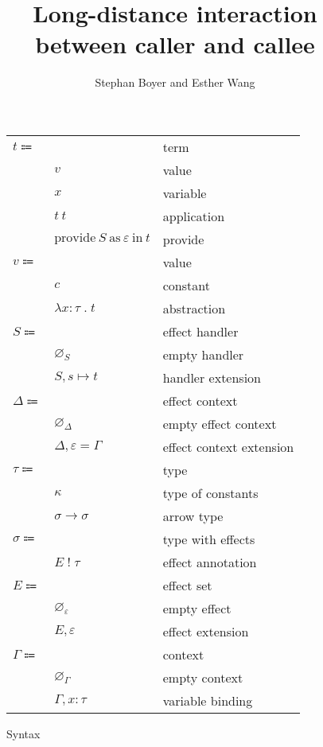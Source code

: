 \documentclass[12pt]{article}
\title{Long-distance interaction \\ between caller and callee}
\author{Stephan Boyer and Esther Wang}
\date{}
\newcommand\eterm{t}
\newcommand\evalue{v}
\newcommand\econst{c}
\newcommand\evar{x}
\newcommand\eabs[2]{\lambda#1\;.\;#2}
\newcommand\eapp[2]{#1\ #2}
\newcommand\eprovide[3]{\text{provide}\ #1\ \text{as}\ #2\ \text{in}\ #3}
\newcommand\pall{S}
\newcommand\pname{s}
\newcommand\pitem[2]{#1\mapsto#2}
\newcommand\pempty{\varnothing_{\pall}}
\newcommand\pextend[2]{#1, #2}
\newcommand\ttype{\tau}
\newcommand\tconst{\kappa}
\newcommand\tarrow[2]{#1\rightarrow#2}
\newcommand\tanno[2]{#1:#2}
\newcommand\tx{\sigma}
\newcommand\twithx[2]{#1\;!\;#2}
\newcommand\xeffect{\varepsilon}
\newcommand\xeffects{E}
\newcommand\xempty{\varnothing_{\xeffect}}
\newcommand\xextend[2]{#1, #2}
\newcommand\xc{\Delta}
\newcommand\xcempty{\varnothing_{\xc}}
\newcommand\xcextend[2]{#1, #2}
\newcommand\xcitem[2]{#1 = #2}
\newcommand\ccontext{\Gamma}
\newcommand\cempty{\varnothing_{\ccontext}}
\newcommand\cextend[2]{#1, #2}
\begin{document}
  \maketitle

  \begin{figure}
    \begin{mdframed}
      \begin{center}
        \begin{tabular}{l l l}
          $\eterm \Coloneqq $ & & term \\
          & $\evalue$ & value \\
          & $\evar$ & variable \\
          & $\eapp{\eterm}{\eterm}$ & application \\
          & $\eprovide{\pall}{\xeffect}{\eterm}$ & provide \\
          $\evalue \Coloneqq $ & & value \\
          & $\econst$ & constant \\
          & $\eabs{\tanno{\evar}{\ttype}}{\eterm}$ & abstraction \\
          $\pall \Coloneqq$ & & effect handler \\
          & $\pempty$ & empty handler \\
          & $\pextend{\pall}{\pitem{\pname}{\eterm}}$ & handler extension \\
          $\xc \Coloneqq$ & & effect context \\
          & $\xcempty$ & empty effect context \\
          & $\xcextend{\xc}{\xcitem{\xeffect}{\ccontext}}$ & effect context extension \\
          $\ttype \Coloneqq$ & & type \\
          & $\tconst$ & type of constants \\
          & $\tarrow{\tx}{\tx}$ & arrow type \\
          $\tx \Coloneqq$ & & type with effects \\
          & $\twithx{\xeffects}{\ttype}$ & effect annotation \\
          $\xeffects \Coloneqq$ & & effect set \\
          & $\xempty$ & empty effect \\
          & $\xextend{\xeffects}{\xeffect}$ & effect extension \\
          $\ccontext \Coloneqq$ & & context \\
          & $\cempty$ & empty context \\
          & $\cextend{\ccontext}{\tanno{\evar}{\ttype}}$ & variable binding \\
        \end{tabular}
      \end{center}

      \caption{Syntax}\label{fig:syntax}
    \end{mdframed}
  \end{figure}
\end{document}
